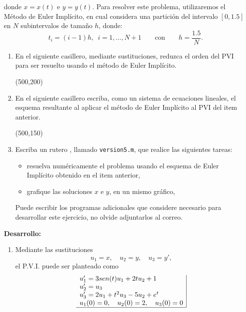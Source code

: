 \documentclass[legalpaper,11pt]{article}
\begin{document}
\begin{enumerate}
\noindent donde $x=x(t)$ e $y=y(t)$. Para resolver este problema, utilizaremos el M\'etodo de Euler Impl\'icito, en cual considera una partici\'on del intervalo $[0, 1{.}5]$ en $N$ subintervalos de tama\~no $h$, donde:
$$t_i=(i-1)h,\,\,\,i=1,\ldots,N+1\qquad \textrm{con} \qquad h=\dfrac{1{.}5}{N}. $$
  \begin{enumerate}
 \item {} En el siguiente casillero, mediante sustituciones, reduzca el orden del PVI para ser resuelto usando el m\'etodo de Euler Impl\'icito.

\hspace{-10mm}
\framebox(500,200){}

\item {} En el siguiente casillero escriba, como un sistema de ecuaciones lineales, el esquema resultante al aplicar el m\'etodo de Euler Impl\'icito al PVI del item anterior.

\hspace{-10mm}
\framebox(500,150){}

\item  Escriba un rutero \matlab, llamado \texttt{version5.m}, que realice las siguientes tareas:
\begin{itemize}
\item {} resuelva num\'ericamente el problema usando el esquema de Euler Impl\'icito obtenido en el item anterior, 
\item {} grafique las soluciones $x$ e $y$, en un mismo gr\'afico,
\end{itemize}
Puede escribir los programas adicionales que considere necesario para desarrollar este ejercicio, no olvide adjuntarlos al correo.
 \end{enumerate}
 
 \textbf{Desarrollo:}
 \begin{enumerate}
\item  Mediante las sustituciones
 $$
 u_1=x, \quad u_2=y, \quad u_3=y',
 $$
 el P.V.I. puede ser planteado como
 $$
 \begin{array}{l|}
 u_1'=3sen(t)u_1+2tu_2+1\\
 u_2'=u_3\\
 u_3'=2u_1+t^2u_3-5u_2+e^t\\
 u_1(0)=0, \quad u_2(0)= 2, \quad u_3(0)=0\\ \hline 
 \end{array}
 $$
\hfill{}


\end{enumerate}
\end{enumerate}
\end{document}

